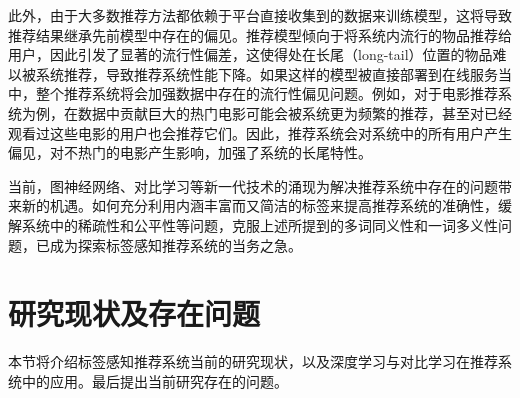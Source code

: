 此外，由于大多数推荐方法都依赖于平台直接收集到的数据来训练模型，这将导致推荐结果继承先前模型中存在的偏见\cite{chen_bias_2021}。推荐模型倾向于将系统内流行的物品推荐给用户，因此引发了显著的流行性偏差，这使得处在长尾（long-tail）位置的物品难以被系统推荐，导致推荐系统性能下降\cite{yin_challenging_2012}。如果这样的模型被直接部署到在线服务当中，整个推荐系统将会加强数据中存在的流行性偏见问题。例如，对于电影推荐系统为例，在数据中贡献巨大的热门电影可能会被系统更为频繁的推荐，甚至对已经观看过这些电影的用户也会推荐它们。因此，推荐系统会对系统中的所有用户产生偏见，对不热门的电影产生影响，加强了系统的长尾特性。


当前，图神经网络、对比学习等新一代技术的涌现为解决推荐系统中存在的问题带来新的机遇。如何充分利用内涵丰富而又简洁的标签来提高推荐系统的准确性，缓解系统中的稀疏性和公平性等问题，克服上述所提到的多词同义性和一词多义性问题，已成为探索标签感知推荐系统的当务之急。

\section{研究现状及存在问题} %
本节将介绍标签感知推荐系统当前的研究现状，以及深度学习与对比学习在推荐系统中的应用。最后提出当前研究存在的问题。
